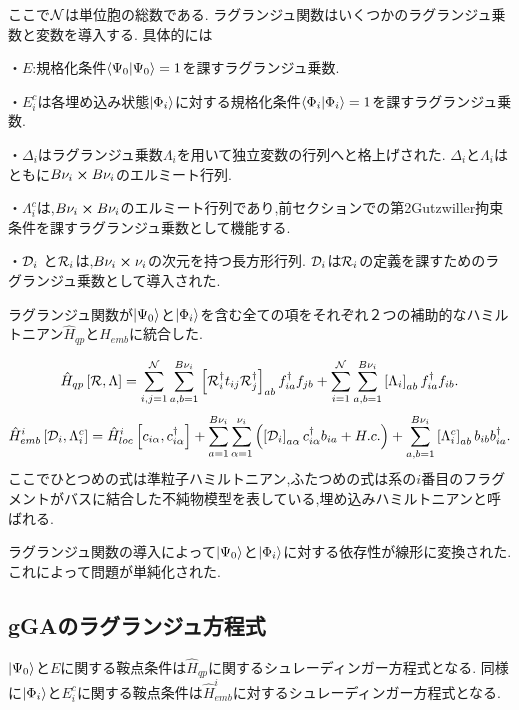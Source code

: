 ここで$\mathcal{N}$は単位胞の総数である.
ラグランジュ関数はいくつかのラグランジュ乗数と変数を導入する.
具体的には

・$E$:規格化条件$\braket{\Psi_{0}}=1$を課すラグランジュ乗数.

・$E^{c}_{i}$は各埋め込み状態$\Ket{\Phi_{i}}$に対する規格化条件$\braket{\Phi_{i}}=1$を課すラグランジュ乗数.

・$\Delta_{i}$はラグランジュ乗数$\Lambda_{i}$を用いて独立変数の行列へと格上げされた.
$\Delta_{i}$と$\Lambda_{i}$はともに$B\nu_{i}\cross B\nu_{i}$のエルミート行列.

・$\Lambda^{c}_{i}$は,$B\nu_{i}\cross B\nu_{i}$のエルミート行列であり,前セクションでの第2Gutzwiller拘束条件を課すラグランジュ乗数として機能する.

・$\mathcal{D}_{i}$ と$\mathcal{R}_{i}$は,$B\nu_{i}\cross \nu_{i}$の次元を持つ長方形行列.
$\mathcal{D}_{i}$は$\mathcal{R}_{i}$の定義を課すためのラグランジュ乗数として導入された.

ラグランジュ関数が$\Ket{\Psi_{0}}$と$\Ket{\Phi_{i}}$を含む全ての項をそれぞれ２つの補助的なハミルトニアン$\hat{H}_{qp}$と$\hat{H}_{emb}$に統合した.

\begin{equation}
    \hat{H}_{qp}\left[ \mathcal{R},\Lambda \right]=\sum_{i,j=1}^{\mathcal{N}}\sum_{a,b=1}^{B\nu_{i}}\left[ \mathcal{R}^\dagger_{i}t_{ij}\mathcal{R}^\dagger_{j} \right]_{ab}f^\dagger_{ia}f_{jb}+\sum_{i=1}^{\mathcal{N}}\sum_{a,b=1}^{B\nu_{i}}\left[ \Lambda_{i} \right]_{ab}f^\dagger_{ia}f_{ib}.
\end{equation}
\begin{equation}
    \hat{H}^{i}_{emb}\left[ \mathcal{D}_{i},\Lambda^{c}_{i} \right]=\hat{H}^{i}_{loc}\left[ c_{i\alpha},c^\dagger_{i\alpha} \right]+\sum_{a=1}^{B\nu_{i}}\sum_{\alpha=1}^{\nu_{i}}\left( \left[ \mathcal{D}_{i} \right]_{a\alpha}c^\dagger_{i\alpha}b_{ia}+H.c. \right)+\sum_{a,b=1}^{B\nu_{i}}\left[ \Lambda^{c}_{i} \right]_{ab}b_{ib}b^\dagger_{ia}.
\end{equation}
ここでひとつめの式は準粒子ハミルトニアン,ふたつめの式は系の$i$番目のフラグメントがバスに結合した不純物模型を表している,埋め込みハミルトニアンと呼ばれる.

ラグランジュ関数の導入によって$\Ket{\Psi_{0}}$と$\Ket{\Phi_{i}}$に対する依存性が線形に変換された.
これによって問題が単純化された.

\subsection{gGAのラグランジュ方程式}
$\Ket{\Psi_{0}}$と$E$に関する鞍点条件は$\hat{H}_{qp}$に関するシュレーディンガー方程式となる.
同様に$\Ket{\Phi_{i}}$と$E^{c}_{i}$に関する鞍点条件は$\hat{H}_{emb}^{i}$に対するシュレーディンガー方程式となる.

